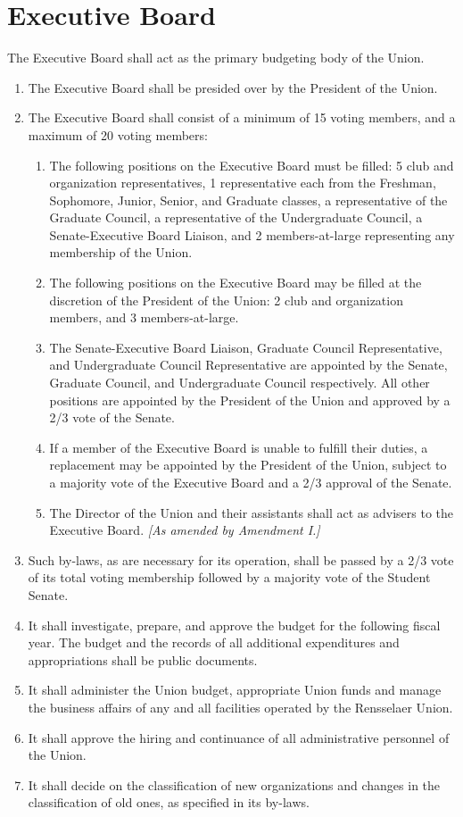 \documentclass{uniondoc}
\begin{document}
\section{Executive Board}

The Executive Board shall act as the primary budgeting body of the Union.

\begin{enumerate}
	\item The Executive Board shall be presided over by the President of the Union.
	\item The Executive Board shall consist of a minimum of 15 voting members, and a maximum of 20 voting members:
	      \begin{enumerate}
		      \item The following positions on the Executive Board must be filled: 5 club and organization representatives, 1 representative each from the Freshman, Sophomore, Junior, Senior, and Graduate classes, a representative of the Graduate Council, a representative of the Undergraduate Council, a Senate-Executive Board Liaison, and 2 members-at-large representing any membership of the Union.
		      \item The following positions on the Executive Board may be filled at the discretion of the President of the Union: 2 club and organization members, and 3 members-at-large.
		      \item The Senate-Executive Board Liaison, Graduate Council Representative, and Undergraduate Council Representative are appointed by the Senate, Graduate Council, and Undergraduate Council respectively. All other positions are appointed by the President of the Union and approved by a 2/3 vote of the Senate.
		      \item If a member of the Executive Board is unable to fulfill their duties, a replacement may be appointed by the President of the Union, subject to a majority vote of the Executive Board and a 2/3 approval of the Senate.
		      \item The Director of the Union and their assistants shall act as advisers to the Executive Board. \textit{[As amended by Amendment I.]}
	      \end{enumerate}
	\item Such by-laws, as are necessary for its operation, shall be passed by a 2/3 vote of its total voting membership followed by a majority vote of the Student Senate.
	\item It shall investigate, prepare, and approve the budget for the following fiscal year. The budget and the records of all additional expenditures and appropriations shall be public documents.
	\item It shall administer the Union budget, appropriate Union funds and manage the business affairs of any and all facilities operated by the Rensselaer Union.
	\item It shall approve the hiring and continuance of all administrative personnel of the Union.
	\item It shall decide on the classification of new organizations and changes in the classification of old ones, as specified in its by-laws.
\end{enumerate}
\end{document}
